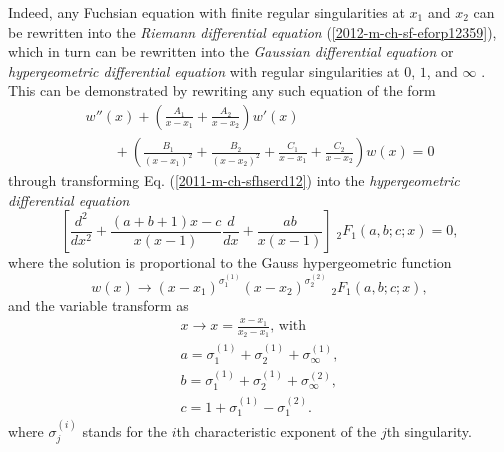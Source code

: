 Indeed, any Fuchsian  equation
with
finite  {regular singularities} at $x_1$ and $x_2$ can be rewritten into the
{\em Riemann differential equation}
(\ref{2012-m-ch-sf-eforp12359}),
which in turn can be rewritten into the
{\em Gaussian differential equation}
or
{\em hypergeometric differential equation}
with
regular singularities
at $0$, $1$, and $\infty$
\cite{hille-69,birkhoff-Rota-48,KristenssonC3}.
This can be demonstrated by rewriting any such equation of the form
\begin{equation}
\begin{split}
 w''(x) + \left( \frac{A_1}{x-x_1}    + \frac{A_2}{x-x_2}
\right) w'(x)
\\ \qquad + \left(  \frac{B_1}{(x-x_1)^2}+\frac{B_2}{(x-x_2)^2} +\frac{C_1}{x-x_1} +\frac{C_2}{x-x_2}
\right)  w(x)  =0
\end{split}
\label{2011-m-ch-sfhserd12}
\end{equation}
through transforming Eq. (\ref{2011-m-ch-sfhserd12}) into the  {\em hypergeometric differential equation}
\begin{equation}
\left[{}\frac{d^2}{dx^2}+ \frac{(a+b+1)x-c}{x(x-1)}\frac{d}{dx}+\frac{ab}{x(x-1)} \right]
{\;}_2F_1(a,b;c;x)=0,
\label{2011-m-ch-sfhserd121eq}
\end{equation}
where the solution is proportional to the Gauss hypergeometric function
\begin{equation}
w(x) \longrightarrow (x-x_1)^{\sigma^{(1)}_1} (x-x_2)^{ \sigma^{(2)}_2} {\;}_2F_1(a,b;c;x),
\end{equation}
 and the variable transform as
\begin{equation}
\begin{split}
x \longrightarrow x = \frac{x-x_1}{x_2-x_1}  \textrm{, with}\\
a=  {\sigma^{(1)}_1}+{\sigma^{(1)}_2}   +{\sigma^{(1)}_\infty},  \\
b=  {\sigma^{(1)}_1}+{\sigma^{(1)}_2}   +{\sigma^{(2)}_\infty} ,\\
c= 1+ {\sigma^{(1)}_1}   -{\sigma^{(2)}_1} .
\end{split}
\label{2011-m-ch-sfhserd121}
\end{equation}
where $\sigma^{(i)}_j$ stands for the $i$th characteristic exponent of the $j$th singularity.


